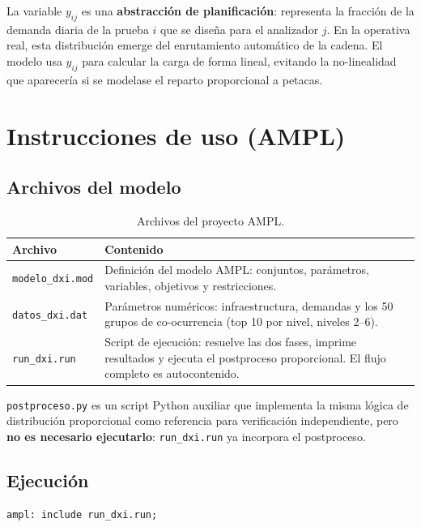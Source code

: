 \documentclass[12pt, a4paper]{article}
\begin{document}
La variable $y_{ij}$ es una \textbf{abstracción de planificación}: representa la fracción
de la demanda diaria de la prueba $i$ que se diseña para el analizador $j$. En la
operativa real, esta distribución emerge del enrutamiento automático de la cadena. El modelo
usa $y_{ij}$ para calcular la carga de forma lineal, evitando la no-linealidad que
aparecería si se modelase el reparto proporcional a petacas.

\clearpage
\section{Instrucciones de uso (AMPL)}

\subsection{Archivos del modelo}

\begin{table}[H]
\centering
\caption{Archivos del proyecto AMPL.}
\begin{tabularx}{\linewidth}{lX}
\toprule
\textbf{Archivo} & \textbf{Contenido} \\
\midrule
\texttt{modelo\_dxi.mod} & Definición del modelo AMPL: conjuntos, parámetros, variables, objetivos y restricciones. \\
\texttt{datos\_dxi.dat} & Parámetros numéricos: infraestructura, demandas y los 50 grupos de co-ocurrencia (top 10 por nivel, niveles 2--6). \\
\texttt{run\_dxi.run} & Script de ejecución: resuelve las dos fases, imprime resultados y ejecuta el postproceso proporcional. El flujo completo es autocontenido. \\
\bottomrule
\end{tabularx}
\end{table}

\texttt{postproceso.py} es un script Python auxiliar que implementa la misma lógica de
distribución proporcional como referencia para verificación independiente, pero
\textbf{no es necesario ejecutarlo}: \texttt{run\_dxi.run} ya incorpora el postproceso.

\subsection{Ejecución}

\begin{lstlisting}[language={},caption={Desde la consola interactiva de AMPL.}]
ampl: include run_dxi.run;
\end{lstlisting}
\end{document}
